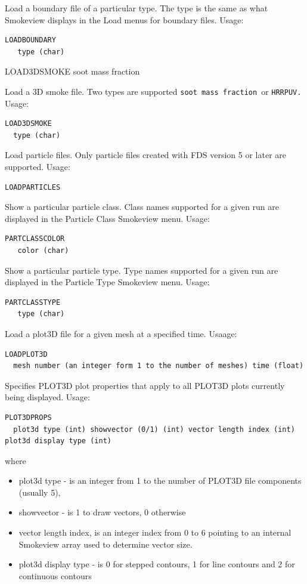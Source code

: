 \documentclass[11pt,twoside]{book}
\newcommand{\hitem}[1]{\item[{\bf #1} \hfill]}
\begin{document}
\hitem{LOADBOUNDARY} Load a boundary file of a particular type.
The type is the same as what Smokeview displays in the Load menus for boundary files.
Usage:
\begin{verbatim}
LOADBOUNDARY
   type (char)
\end{verbatim}
LOAD3DSMOKE
 soot mass fraction

\hitem{LOAD3DSMOKE}
Load a 3D smoke file.  Two types are supported {\tt soot mass fraction}\ or {\tt HRRPUV.}
Usage:
\begin{verbatim}
LOAD3DSMOKE
  type (char)
\end{verbatim}

\hitem{LOADPARTICLES}Load particle files.  Only particle files created with FDS version 5 or
later are supported.
Usage:
\begin{verbatim}
LOADPARTICLES
\end{verbatim}

\hitem{PARTCLASSCOLOR}Show a particular particle class.  Class names supported for a given
run are displayed in the Particle Class Smokeview menu.
Usage:
\begin{verbatim}
PARTCLASSCOLOR
   color (char)
\end{verbatim}

\hitem{PARTCLASSTYPE}Show a particular particle type.  Type names supported for a given
run are displayed in the Particle Type Smokeview menu.
Usage:
\begin{verbatim}
PARTCLASSTYPE
   type (char)
\end{verbatim}

\hitem{LOADPLOT3D}Load a plot3D file for a given mesh at a specified time.
Usaage:
\begin{verbatim}
LOADPLOT3D
  mesh number (an integer form 1 to the number of meshes) time (float)
\end{verbatim}

\hitem{PLOT3DPROPS}Specifies PLOT3D plot properties that apply to all PLOT3D plots currently being displayed.
Usage:
\begin{verbatim}
PLOT3DPROPS
  plot3d type (int) showvector (0/1) (int) vector length index (int) plot3d display type (int)
\end{verbatim}
where
\begin{itemize}
\item plot3d type - is an integer from 1 to the number of PLOT3D file components (usually 5),
\item showvector - is 1 to draw vectors, 0 otherwise
\item vector length index, is an integer index from 0 to 6 pointing to an internal Smokeview array used to determine vector size.
\item plot3d display type - is 0 for stepped contours, 1 for line contours and 2 for continuous contours
\end{itemize}
\end{document}
